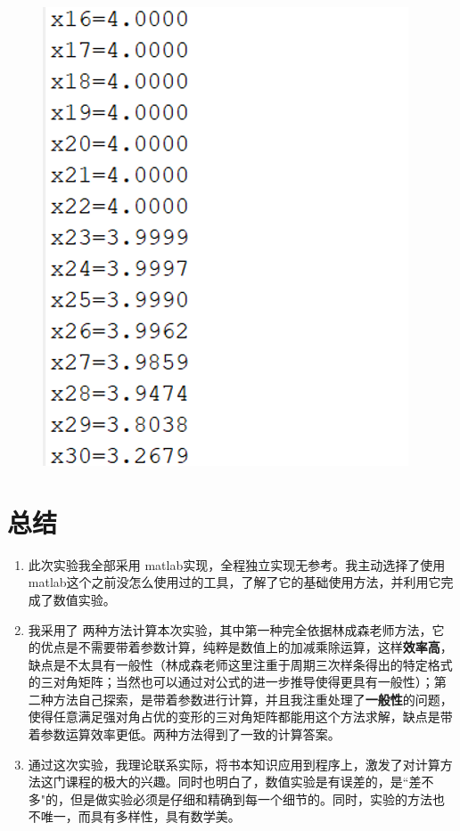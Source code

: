 \documentclass{LabReport}
\begin{document}
\begin{figure}[h!]
\begin{minipage}[t]{0.41\textwidth}
		\includegraphics[width=\linewidth]{figures/4} %
		\label{fig:right_image} %
	\end{minipage}
\end{figure}

\section{总结}

\begin{enumerate}
	\item 此次实验我全部采用{\color{red} matlab}实现，全程独立实现无参考。我主动选择了使用matlab这个之前没怎么使用过的工具，了解了它的基础使用方法，并利用它完成了数值实验。
	\item 我采用了{\color{red} 两种方法}计算本次实验，其中第一种完全依据林成森老师方法，它的优点是不需要带着参数计算，纯粹是数值上的加减乘除运算，这样\textbf{效率高}，缺点是不太具有一般性（林成森老师这里注重于周期三次样条得出的特定格式的三对角矩阵；当然也可以通过对公式的进一步推导使得更具有一般性）；第二种方法自己探索，是带着参数进行计算，并且我注重处理了\textbf{一般性}的问题，使得任意满足强对角占优的变形的三对角矩阵都能用这个方法求解，缺点是带着参数运算效率更低。两种方法得到了一致的计算答案。
	\item 通过这次实验，我理论联系实际，将书本知识应用到程序上，激发了对计算方法这门课程的极大的兴趣。同时也明白了，数值实验是有误差的，是``差不多"的，但是做实验必须是仔细和精确到每一个细节的。同时，实验的方法也不唯一，而具有多样性，具有数学美。
\end{enumerate}
\end{document}
